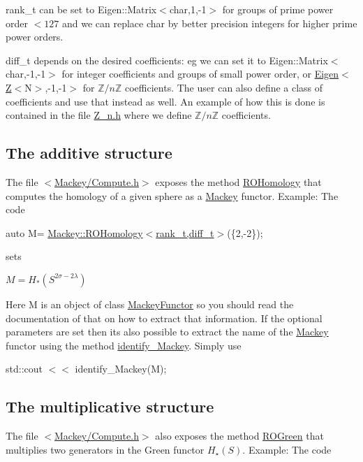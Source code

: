 \begin{DoxyItemize}
\item {\ttfamily rank\+\_\+t} can be set to {\ttfamily Eigen\+::\+Matrix$<$char,1,-\/1$>$} for groups of prime power order $<127$ and we can replace {\ttfamily char} by better precision integers for higher prime power orders.
\item {\ttfamily diff\+\_\+t} depends on the desired coefficients\+: eg we can set it to {\ttfamily Eigen\+::\+Matrix$<$char,-\/1,-\/1$>$} for integer coefficients and groups of small power order, or {\ttfamily \hyperlink{namespaceEigen}{Eigen}$<$\hyperlink{classZ}{Z}$<$N$>$,-\/1,-\/1$>$} for $\mathbb Z/n\mathbb Z$ coefficients. The user can also define a class of coefficients and use that instead as well. An example of how this is done is contained in the file {\ttfamily \hyperlink{Z__n_8h}{Z\+\_\+n.\+h}} where we define $\mathbb Z/n\mathbb Z$ coefficients.
\end{DoxyItemize}\hypertarget{use_step1add}{}\subsection{The additive structure}\label{use_step1add}
The file {\ttfamily $<$\hyperlink{Compute_8h}{Mackey/\+Compute.\+h}$>$} exposes the method \hyperlink{namespaceMackey_a58708ee937b0c4172b7cde8e5f856504}{R\+O\+Homology} that computes the homology of a given sphere as a \hyperlink{namespaceMackey}{Mackey} functor. Example\+: The code

{\ttfamily  auto M= \hyperlink{namespaceMackey_a58708ee937b0c4172b7cde8e5f856504}{Mackey\+::\+R\+O\+Homology$<$rank\+\_\+t,diff\+\_\+t$>$}(\{2,-\/2\}); }

sets

$ M=H_*(S^{2\sigma-2\lambda})$

Here {\ttfamily M} is an object of class \hyperlink{classMackey_1_1MackeyFunctor}{Mackey\+Functor} so you should read the documentation of that on how to extract that information. If the optional parameters are set then it\textquotesingle{}s also possible to extract the name of the \hyperlink{namespaceMackey}{Mackey} functor using the method \hyperlink{namespaceMackey_ad0ca46ae450950b13360c44a2de1cb43}{identify\+\_\+\+Mackey}. Simply use

{\ttfamily  std\+::cout $<$$<$ identify\+\_\+\+Mackey(\+M); }\hypertarget{use_step1mult}{}\subsection{The multiplicative structure}\label{use_step1mult}
The file {\ttfamily $<$\hyperlink{Compute_8h}{Mackey/\+Compute.\+h}$>$} also exposes the method \hyperlink{namespaceMackey_a2bd86833844ca62d76c47a54aeb0bb77}{R\+O\+Green} that multiplies two generators in the Green functor $H_{\star}(S)$. Example\+: The code

